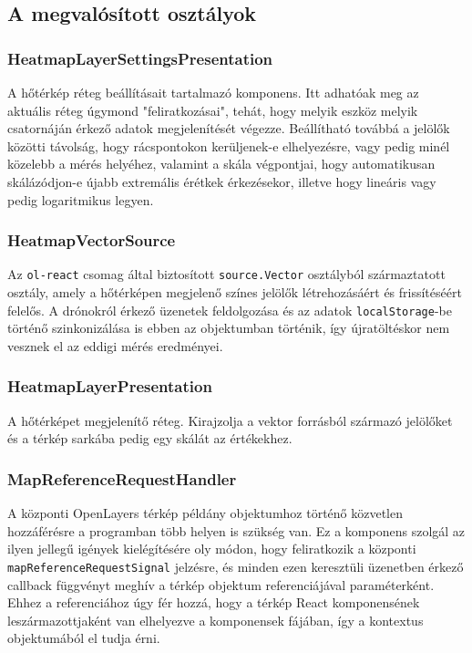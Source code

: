 \subsection{A megvalósított osztályok}

\subsubsection{HeatmapLayerSettingsPresentation}
A hőtérkép réteg beállításait tartalmazó komponens.
Itt adhatóak meg az aktuális réteg úgymond "feliratkozásai", tehát, hogy melyik
eszköz melyik csatornáján érkező adatok megjelenítését végezze.
Beállítható továbbá a jelölők közötti távolság, hogy rácspontokon kerüljenek-e
elhelyezésre, vagy pedig minél közelebb a mérés helyéhez, valamint a skála
végpontjai, hogy automatikusan skálázódjon-e újabb extremális érétkek
érkezésekor, illetve hogy lineáris vagy pedig logaritmikus legyen.

\subsubsection{HeatmapVectorSource}
Az \verb|ol-react| csomag által biztosított \verb|source.Vector| osztályból
származtatott osztály, amely a hőtérképen megjelenő színes jelölők
létrehozásáért és frissítéséért felelős.
A drónokról érkező üzenetek feldolgozása és az adatok \verb|localStorage|-be
történő szinkonizálása is ebben az objektumban történik, így újratöltéskor nem
vesznek el az eddigi mérés eredményei.

\subsubsection{HeatmapLayerPresentation}
A hőtérképet megjelenítő réteg. Kirajzolja a vektor forrásból származó jelölőket
és a térkép sarkába pedig egy skálát az értékekhez.

\subsubsection{MapReferenceRequestHandler}
A központi OpenLayers térkép példány objektumhoz történő közvetlen hozzáférésre
a programban több helyen is szükség van. Ez a komponens szolgál az ilyen jellegű
igények kielégítésére oly módon, hogy feliratkozik a központi
\verb|mapReferenceRequestSignal| jelzésre, és minden ezen keresztüli üzenetben
érkező callback függvényt meghív a térkép objektum referenciájával
paraméterként. Ehhez a referenciához úgy fér hozzá, hogy a térkép React
komponensének leszármazottjaként van elhelyezve a komponensek fájában, így a
kontextus objektumából el tudja érni.

